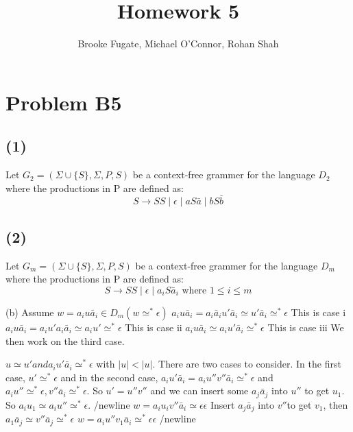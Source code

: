 \documentclass[12pt]{article}
\begin{document}
\pagestyle{plain}
\titleformat{\subsection}[runin]
  {\normalfont\large\bfseries}{\thesubsection}{1em}{}

\title{Homework 5}
\author{Brooke Fugate, Michael O'Connor, Rohan Shah}
\date{}

\maketitle

\section*{Problem B5}
\subsection*{(1)} Let $G_2 = (\Sigma\cup \{S\},\Sigma,P,S)$ be a context-free
grammer for the language $D_2$ where the productions in P are defined as:
$$ S \rightarrow SS \mid \epsilon \mid aS\bar a \mid bS\bar b$$

\subsection*{(2)} Let $G_m = (\Sigma\cup \{S\},\Sigma,P,S)$ be a context-free
grammer for the language $D_m$ where the productions in P are defined as:
$$S \rightarrow SS\mid \epsilon \mid a_iS\bar a_i \text{ where } 1\le i\le m$$

\medskip

(b) 
Assume $w=a_iu \bar a_i \in D_m(w \simeq^{*} \epsilon)$ \newline
$a_iu \bar a_i = a_i \bar a_i u' \bar a_i \simeq u' \bar a_i \simeq^{*} \epsilon$ This is case i\newline
$a_iu \bar a_i = a_i u'a_i \bar a_i \simeq a_iu' \simeq^{*} \epsilon$ This is case ii \newline
$a_iu \bar a_i \simeq a_i u' \bar a_i \simeq^{*} \epsilon$ This is case iii \newline We then work on the third case.

$u \simeq u' and a_iu' \bar a_i \simeq^* \epsilon$ with $|u| < |u|$. There are two cases to consider. In the first case, $u' \simeq^{*} \epsilon$ and in the second case, $a_iu' \bar a_i = a_iu''v'' \bar a_i \simeq^{*} \epsilon$ and $a_iu'' \simeq^{*} \epsilon , v'' \bar a_i \simeq^{*} \epsilon$. So $u'=u''v''$ and we can insert some $a_j\bar a_j$ into $u''$ to get $u_1$. So $a_iu_1 \simeq a_iu'' \simeq^* \epsilon$. /newline
$w=a_iu_iv'' \bar a_i \simeq \epsilon \epsilon$ \newline
Insert $a_j \bar a_j$ into $v''$to get $v_1$, then $a_1 \bar a_j \simeq v'' \bar a_j \simeq^* \epsilon$ \newline
$w=a_iu''v_1 \bar a_i \simeq^* \epsilon \epsilon$ /newline
\end{document}
